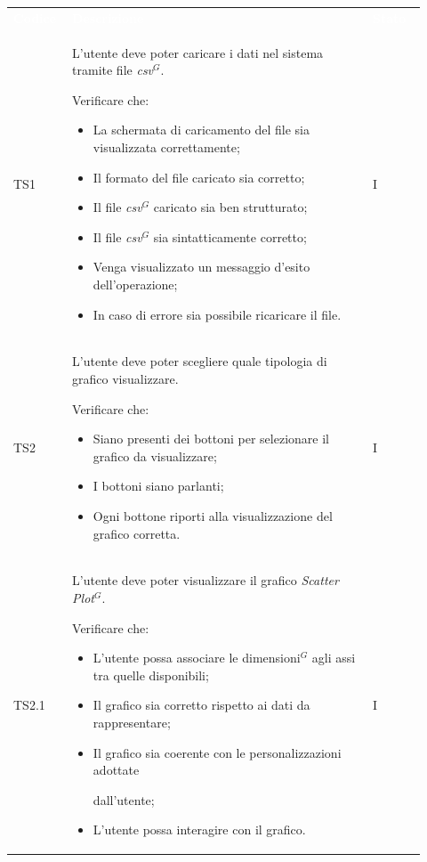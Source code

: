 \renewcommand{\arraystretch}{1.5}
\begin{longtable}{p{0.12\linewidth}p{0.68\linewidth}p{0.12\linewidth}}
	\rowcolor[RGB]{33, 73, 50}
	\textcolor{white}{\textbf{Codice}} & \textcolor{white}{\textbf{Descrizione}} & \textcolor{white}{\textbf{Stato}}\\
    
    \rowcolor[RGB]{233, 245, 206}
    TS1 & 
    L'utente deve poter caricare i dati nel sistema tramite file \textit{csv}$^{G}$. \par Verificare che: 
    \begin{itemize}
        \item La schermata di caricamento del file sia visualizzata correttamente;
        \item Il formato del file caricato sia corretto;
        \item Il file \textit{csv}$^{G}$ caricato sia ben strutturato;
        \item Il file \textit{csv}$^{G}$ sia sintatticamente corretto;
        \item Venga visualizzato un messaggio d'esito dell'operazione; 
        \item In caso di errore sia possibile ricaricare il file.
    \end{itemize}&
    I \\

    \rowcolor[RGB]{216, 235, 171}
    TS2 &
    L'utente deve poter scegliere quale tipologia di grafico visualizzare. \par Verificare che:
    \begin{itemize}
        \item Siano presenti dei bottoni per selezionare il grafico da visualizzare;
        \item I bottoni siano parlanti;
        \item Ogni bottone riporti alla visualizzazione del grafico corretta.
    \end{itemize}&
    I\\

    \rowcolor[RGB]{233, 245, 206}
    TS2.1 & 
    L'utente deve poter visualizzare il grafico \textit{Scatter Plot}$^{G}$. 
    \par Verificare che: 
    \begin{itemize}
        \item L'utente possa associare le dimensioni$^{G}$ agli assi tra quelle disponibili;
        \item Il grafico sia corretto rispetto ai dati da rappresentare;
        \item Il grafico sia coerente con le personalizzazioni adottate \par dall'utente;
        \item L'utente possa interagire con il grafico.
    \end{itemize}&
    I\\


\end{longtable}
